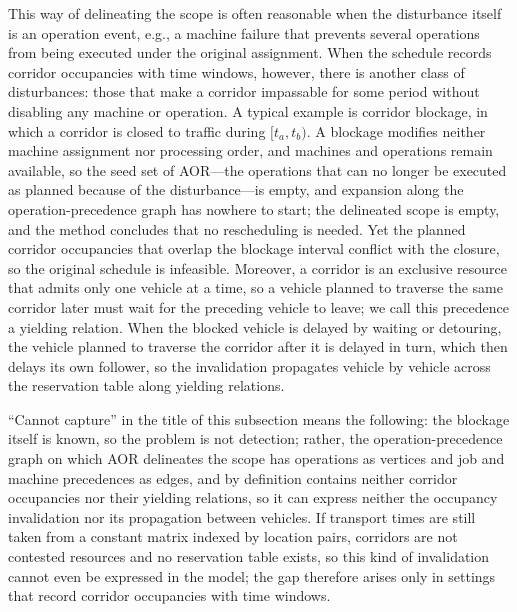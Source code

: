 \documentclass[manuscript,screen,review]{acmart}
\begin{document}
This way of delineating the scope is often reasonable when the disturbance itself is an operation event, e.g., a machine failure that prevents several operations from being executed under the original assignment.
When the schedule records corridor occupancies with time windows, however, there is another class of disturbances: those that make a corridor impassable for some period without disabling any machine or operation. A typical example is corridor blockage,
in which a corridor is closed to traffic during \([t_a,t_b)\). A blockage modifies neither machine assignment nor processing order, and machines and operations remain available,
so the seed set of AOR---the operations that can no longer be executed as planned because of the disturbance---is empty, and expansion along the operation-precedence graph has nowhere to start;
the delineated scope is empty, and the method concludes that no rescheduling is needed.
Yet the planned corridor occupancies that overlap the blockage interval conflict with the closure, so the original schedule is infeasible.
Moreover, a corridor is an exclusive resource that admits only one vehicle at a time, so a vehicle planned to traverse the same corridor later must wait for the preceding vehicle to leave; we call this precedence a yielding relation.
When the blocked vehicle is delayed by waiting or detouring, the vehicle planned to traverse the corridor after it is delayed in turn, which then delays its own follower, so the invalidation propagates vehicle by vehicle across the reservation table along yielding relations.

``Cannot capture'' in the title of this subsection means the following: the blockage itself is known, so the problem is not detection; rather, the operation-precedence graph on which AOR delineates the scope has operations as vertices and job and machine precedences as edges,
and by definition contains neither corridor occupancies nor their yielding relations, so it can express neither the occupancy invalidation nor its propagation between vehicles.
If transport times are still taken from a constant matrix indexed by location pairs, corridors are not contested resources and no reservation table exists, so this kind of invalidation cannot even be expressed in the model;
the gap therefore arises only in settings that record corridor occupancies with time windows.
\end{document}
